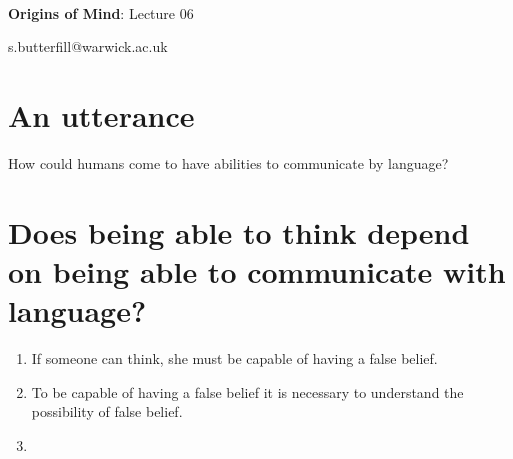 \documentclass[12pt]{extarticle}
\date{}
\makeatletter
\def \ititle {Origins of Mind}
\def \isubtitle {Lecture 06}
\def \iemail{s.butterfill@warwick.ac.uk}
\makeatother
\begin{document}
\begin{multicols}{3}

\setlength\footnotesep{1em}









\def \ititle {Origins of Mind}
 
\def \isubtitle {Lecture 06}
 
 
 
\
 
 
 
\begin{center}
 
{\Large
 
\textbf{\ititle}: \isubtitle
 
}
 
 
 
\iemail %
 
\end{center}
 
 
 
\section{An utterance}
 
How could humans come to have abilities to communicate by language?
 
 
 
\section{Does being able to think depend on being able to communicate with language?}
 
\begin{enumerate}
 
\item
 
If someone can think, she must be capable of having a false belief.
 
\item
 
To be capable of having a false belief it is necessary to understand the possibility of false belief.
 
\item
 

\end{enumerate}
\end{multicols}
\end{document}

